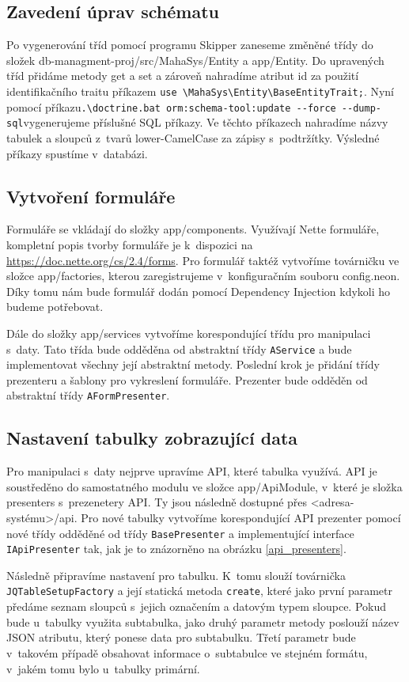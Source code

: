 \documentclass[thesis=B,czech]{FITthesis}[2012/06/26]
\begin{document}
\subsection{Zavedení úprav schématu}
	Po vygenerování tříd pomocí programu Skipper zaneseme změněné třídy do složek db-managment-proj/src/MahaSys/Entity a app/Entity. Do upravených tříd přidáme metody get a set a zároveň nahradíme atribut id za použití identifikačního traitu příkazem \verb|use \MahaSys\Entity\BaseEntityTrait;|. Nyní pomocí příkazu\newline\verb|.\doctrine.bat orm:schema-tool:update --force --dump-sql|\newline vygenerujeme příslušné SQL příkazy. Ve těchto příkazech nahradíme názvy tabulek a sloupců z~tvarů lower-CamelCase za zápisy s~podtržítky. Výsledné příkazy spustíme v~databázi.
\subsection{Vytvoření formuláře}
	Formuláře se vkládají do složky app/components. Využívají Nette formuláře, kompletní popis tvorby formuláře je k~dispozici na \url{https://doc.nette.org/cs/2.4/forms}. Pro formulář taktéž vytvoříme továrničku ve složce app/factories, kterou zaregistrujeme v~konfiguračním souboru config.neon. Díky tomu nám bude formulář dodán pomocí Dependency Injection kdykoli ho budeme potřebovat. 

	Dále do složky app/services vytvoříme korespondující třídu pro manipulaci s~daty. Tato třída bude odděděna od abstraktní třídy \verb|AService| a bude implementovat všechny její abstraktní metody. Poslední krok je přidání třídy prezenteru a šablony pro vykreslení formuláře. Prezenter bude odděděn od abstraktní třídy \verb|AFormPresenter|.
\subsection{Nastavení tabulky zobrazující data}
	Pro manipulaci s~daty nejprve upravíme API, které tabulka využívá. API je soustředěno do samostatného modulu ve složce app/ApiModule, v~které je složka presenters s~prezenetery API. Ty jsou následně dostupné přes <adresa-systému>/api. Pro nové tabulky vytvoříme korespondující API prezenter pomocí nové třídy odděděné od třídy \verb|BasePresenter| a implementující interface \verb|IApiPresenter| tak, jak je to znázorněno na obrázku \ref{api_presenters}. 

	Následně připravíme nastavení pro tabulku. K~tomu slouží továrnička \verb|JQTableSetupFactory| a její statická metoda \verb|create|, které jako první parametr předáme seznam sloupců s~jejich označením a datovým typem sloupce. Pokud bude u~tabulky využita subtabulka, jako druhý parametr metody poslouží název JSON atributu, který ponese data pro subtabulku. Třetí parametr bude v~takovém případě obsahovat informace o~subtabulce ve stejném formátu, v~jakém tomu bylo u~tabulky primární.
\end{document}
